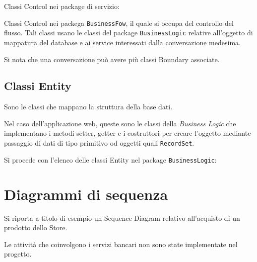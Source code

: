 	
	Classi Control nei package di servizio:
	
	
	Classi Control nei packega \texttt{BusinessFow}, il quale si occupa del controllo del flusso. Tali classi usano le classi del package \texttt{BusinessLogic} relative all'oggetto di mappatura del database e ai service interessati dalla conversazione medesima.
	
	Si nota che una conversazione può avere più classi Boundary associate.
	
	\subsection{Classi Entity}
	Sono le classi che mappano la struttura della base dati.
	
	Nel caso dell'applicazione web, queste sono le classi della \emph{Business Logic} che implementano i metodi setter, getter e i costruttori per creare l'oggetto mediante passaggio di dati di tipo primitivo od oggetti quali \texttt{RecordSet}.
	
	Si procede con l'elenco delle classi Entity nel package \texttt{BusinessLogic}:

\section{Diagrammi di sequenza}
Si riporta a titolo di esempio un Sequence Diagram relativo all'acquisto di un prodotto dello Store.

Le attività che coinvolgono i servizi bancari non sono state implementate nel progetto.